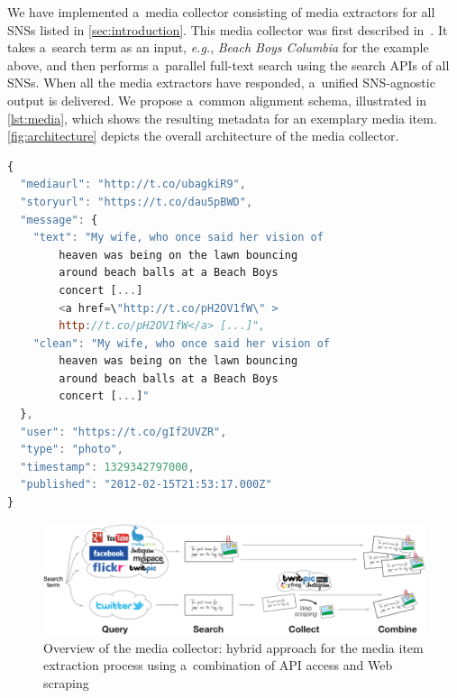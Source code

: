 \documentclass[runningheads,a4paper]{llncs}
\newcommand{\googleplus}{Google\nolinebreak\hspace{0em}\raisebox{.28ex}{\tiny\bf +}\kern-0.2ex\xspace}
\begin{document}
{We have implemented a~media collector consisting of media extractors for all SNSs listed in \autoref{sec:introduction}.
This media collector was first described in~\cite{Khrouf2012}.
It takes a~search term as an input, \emph{e.g.}, \emph{Beach Boys Columbia} for the example above, and then performs a~parallel full-text search using the search APIs of all SNSs. When all the media extractors have responded, a~unified SNS-agnostic output is delivered. We propose a~common alignment schema, illustrated in
\autoref{lst:media}, which shows the resulting metadata for an exemplary media item.  \autoref{fig:architecture} depicts the overall architecture of the media collector.

\begin{lstlisting}[language=JavaScript,caption={Sample output of the media collector showing a~Google+ post (edited for legibility, URLs shortened).},label={lst:media}]
{
  "mediaurl": "http://t.co/ubagkiR9",
  "storyurl": "https://t.co/dau5pBWD",
  "message": {
    "text": "My wife, who once said her vision of
        heaven was being on the lawn bouncing
        around beach balls at a Beach Boys
        concert [...]
        <a href=\"http://t.co/pH2OV1fW\" >
        http://t.co/pH2OV1fW</a> [...]",
    "clean": "My wife, who once said her vision of
        heaven was being on the lawn bouncing
        around beach balls at a Beach Boys
        concert [...]"
  },
  "user": "https://t.co/gIf2UVZR",
  "type": "photo",
  "timestamp": 1329342797000,
  "published": "2012-02-15T21:53:17.000Z"
}
\end{lstlisting}

\begin{figure}[htb!]
\centering
\includegraphics[width=0.8\linewidth]{./architecture.pdf}
\caption{Overview of the media collector: hybrid approach for the media item extraction process using a~combination of API access and Web scraping}
\label{fig:architecture}
\end{figure}

}
\end{document}
